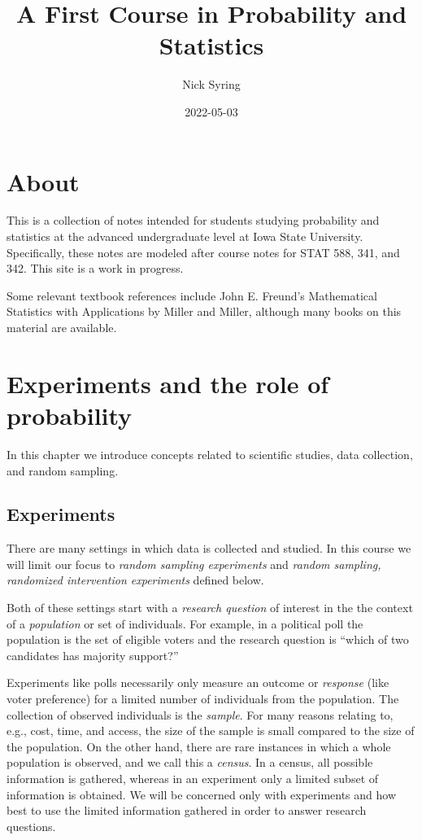 \documentclass[
]{book}
\title{A First Course in Probability and Statistics}
\author{Nick Syring}
\date{2022-05-03}
\begin{document}
\maketitle

{
\setcounter{tocdepth}{1}
\tableofcontents
}
\hypertarget{about}{%
\chapter{About}\label{about}}

This is a collection of notes intended for students studying probability and statistics at the advanced undergraduate level at Iowa State University. Specifically, these notes are modeled after course notes for STAT 588, 341, and 342. This site is a work in progress.

Some relevant textbook references include John E. Freund's Mathematical Statistics with Applications by Miller and Miller, although many books on this material are available.

\hypertarget{experiments-and-the-role-of-probability}{%
\chapter{Experiments and the role of probability}\label{experiments-and-the-role-of-probability}}

In this chapter we introduce concepts related to scientific studies, data collection, and random sampling.

\hypertarget{experiments}{%
\section{Experiments}\label{experiments}}

There are many settings in which data is collected and studied. In this course we will limit our focus to \emph{random sampling experiments} and \emph{random sampling, randomized intervention experiments} defined below.

Both of these settings start with a \emph{research question} of interest in the the context of a \emph{population} or set of individuals. For example, in a political poll the population is the set of eligible voters and the research question is ``which of two candidates has majority support?''

Experiments like polls necessarily only measure an outcome or \emph{response} (like voter preference) for a limited number of individuals from the population. The collection of observed individuals is the \emph{sample}. For many reasons relating to, e.g., cost, time, and access, the size of the sample is small compared to the size of the population. On the other hand, there are rare instances in which a whole population is observed, and we call this a \emph{census}. In a census, all possible information is gathered, whereas in an experiment only a limited subset of information is obtained. We will be concerned only with experiments and how best to use the limited information gathered in order to answer research questions.
\end{document}
